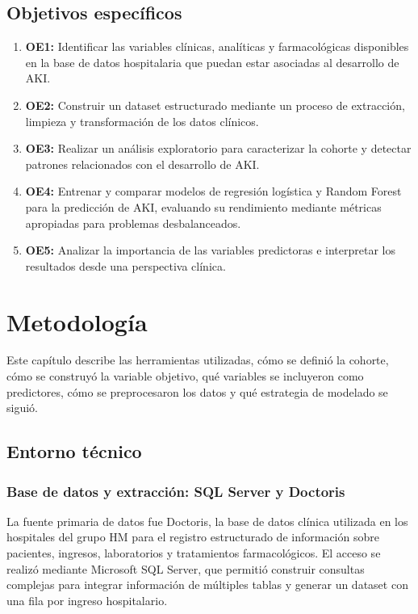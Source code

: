 \documentclass[12pt, a4paper, oneside]{report}
\begin{document}
\section{Objetivos específicos}
\label{sec:obj_especificos}

\begin{enumerate}
    \item \textbf{OE1:} Identificar las variables clínicas, analíticas y farmacológicas disponibles en la base de datos hospitalaria que puedan estar asociadas al desarrollo de AKI.
    \item \textbf{OE2:} Construir un dataset estructurado mediante un proceso de extracción, limpieza y transformación de los datos clínicos.
    \item \textbf{OE3:} Realizar un análisis exploratorio para caracterizar la cohorte y detectar patrones relacionados con el desarrollo de AKI.
    \item \textbf{OE4:} Entrenar y comparar modelos de regresión logística y Random Forest para la predicción de AKI, evaluando su rendimiento mediante métricas apropiadas para problemas desbalanceados.
    \item \textbf{OE5:} Analizar la importancia de las variables predictoras e interpretar los resultados desde una perspectiva clínica.
\end{enumerate}

\chapter{Metodología}
\label{chap:metodologia}

Este capítulo describe las herramientas utilizadas, cómo se definió la cohorte, cómo se construyó la variable objetivo, qué variables se incluyeron como predictores, cómo se preprocesaron los datos y qué estrategia de modelado se siguió.

\section{Entorno técnico}

\subsection{Base de datos y extracción: SQL Server y Doctoris}

La fuente primaria de datos fue Doctoris, la base de datos clínica utilizada en los hospitales del grupo HM para el registro estructurado de información sobre pacientes, ingresos, laboratorios y tratamientos farmacológicos. El acceso se realizó mediante Microsoft SQL Server, que permitió construir consultas complejas para integrar información de múltiples tablas y generar un dataset con una fila por ingreso hospitalario.
\end{document}
